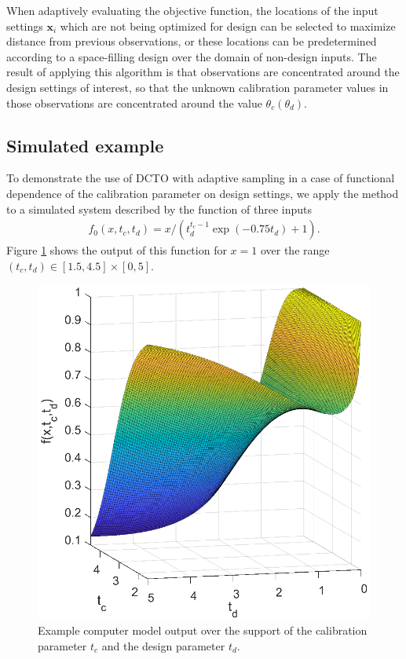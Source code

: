 \documentclass[10pt]{asme2ej}
\begin{document}
%
When adaptively evaluating the objective function, the locations of the input settings $\mathbf x_i$ which are not being optimized for design can be selected to maximize distance from previous observations, or these locations can be predetermined according to a space-filling design over the domain of non-design inputs.
%
The result of applying this algorithm is that observations are concentrated around the design settings of interest, so that the unknown calibration parameter values in those observations are concentrated around the value $\theta_c(\theta_d)$.
%

\subsection{Simulated example}
%
To demonstrate the use of DCTO with adaptive sampling in a case of functional dependence of the calibration parameter on design settings, we apply the method to a simulated system described by the function of three inputs 
%
\begin{align}
	f_0(x,t_c,t_d) = x / (t_d^{t_c-1}\exp(-0.75t_d)+1). \label{eq:f0}
\end{align}
%
Figure \ref{fig:example_output} shows the output of this function for $x=1$ over the range $(t_c,t_d)\in[1.5,4.5]\times[0,5]$.
%
\begin{figure}
	\centering
	\includegraphics[scale=0.85]{figures/figure_1.eps}
	\captionsetup{width=.85\linewidth}
	\caption{Example computer model output over the support of the calibration parameter $t_c$ and the design parameter $t_d$.}
	\label{fig:example_output}
\end{figure}
\end{document}
